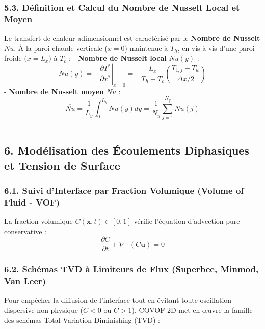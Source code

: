 \documentclass[
  french,
]{article}
\begin{document}
\subsubsection{5.3. Définition et Calcul du Nombre de Nusselt Local et
Moyen}\label{duxe9finition-et-calcul-du-nombre-de-nusselt-local-et-moyen}

Le transfert de chaleur adimensionnel est caractérisé par le
\textbf{Nombre de Nusselt} \(Nu\). À la paroi chaude verticale
(\(x = 0\)) maintenue à \(T_h\), en vis-à-vis d'une paroi froide
(\(x = L_x\)) à \(T_c\) : - \textbf{Nombre de Nusselt local} \(Nu(y)\) :
\[Nu(y) = - \left. \frac{\partial T^*}{\partial x^*} \right|_{x=0} = - \frac{L_x}{T_h - T_c} \left( \frac{T_{1, j} - T_w}{\Delta x / 2} \right)\]
- \textbf{Nombre de Nusselt moyen} \(\overline{Nu}\) :
\[\overline{Nu} = \frac{1}{L_y} \int_0^{L_y} Nu(y) dy = \frac{1}{N_y} \sum_{j=1}^{N_y} Nu(j)\]

\begin{center}\rule{0.5\linewidth}{0.5pt}\end{center}

\subsection{6. Modélisation des Écoulements Diphasiques et Tension de
Surface}\label{moduxe9lisation-des-uxe9coulements-diphasiques-et-tension-de-surface}

\subsubsection{6.1. Suivi d'Interface par Fraction Volumique (Volume of
Fluid -
VOF)}\label{suivi-dinterface-par-fraction-volumique-volume-of-fluid---vof}

La fraction volumique \(C(\mathbf{x}, t) \in [0, 1]\) vérifie l'équation
d'advection pure conservative :
\[\frac{\partial C}{\partial t} + \nabla \cdot (C \mathbf{u}) = 0\]

\subsubsection{6.2. Schémas TVD à Limiteurs de Flux (Superbee, Minmod,
Van
Leer)}\label{schuxe9mas-tvd-uxe0-limiteurs-de-flux-superbee-minmod-van-leer}

Pour empêcher la diffusion de l'interface tout en évitant toute
oscillation dispersive non physique (\(C < 0\) ou \(C > 1\)), COVOF 2D
met en œuvre la famille des schémas Total Variation Diminishing (TVD) :
\end{document}
